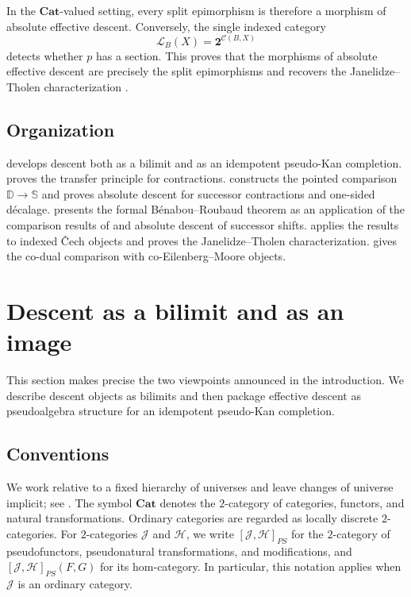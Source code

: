\documentclass[11pt,a4paper]{article}
\numberwithin{equation}{section}
\theoremstyle{definition}
\theoremstyle{remark}
\newcommand{\Hcat}{\mathcal H}
\newcommand{\C}{\mathcal C}
\newcommand{\Lx}{\mathcal L}
\newcommand{\Cat}{\mathbf{Cat}}
\newcommand{\two}{\mathbf 2}
\newcommand{\Dmon}{\mathbb D}
\newcommand{\Smon}{\mathbb S}
\begin{document}
In the \(\Cat\)-valued setting, every split epimorphism is therefore a
morphism of absolute effective descent. Conversely, the single indexed category
\[
\Lx_B(X)=\two^{\C(B,X)}
\]
detects whether \(p\) has a section. This proves that the morphisms of
absolute effective descent are precisely the split epimorphisms and
recovers the Janelidze--Tholen characterization
\cite[Theorem~3.5]{JanelidzeTholen1997}.

\subsection*{Organization}

 develops descent both as a bilimit and as an
idempotent pseudo-Kan completion.  proves the
transfer principle for contractions.
 constructs the pointed comparison
\(\Dmon\to\Smon\) and proves absolute descent for successor
contractions and one-sided d\'ecalage.  presents the
formal B\'enabou--Roubaud theorem as an application of the comparison
results of \cite{Nunes2018} and absolute descent of successor shifts.  applies the results to
indexed \v{C}ech objects and proves the Janelidze--Tholen
characterization.  gives the co-dual comparison
with co-Eilenberg--Moore objects.

\section{Descent as a bilimit and as an image}
\label{sec:descent}

This section makes precise the two viewpoints announced in the
introduction. We describe descent objects as bilimits and then package effective
descent as pseudoalgebra structure for an idempotent pseudo-Kan
completion.

\subsection{Conventions}

We work relative to a fixed hierarchy of universes and leave changes
of universe implicit; see \cite{Levy2018}. The symbol $\Cat$ denotes
the $2$-category of categories, functors, and natural transformations.
Ordinary categories are regarded as locally discrete $2$-categories.
For $2$-categories $\mathcal J$ and $\Hcat$, we
write $[\mathcal J,\Hcat]_{PS}$ for the $2$-category of
pseudofunctors, pseudonatural transformations, and modifications, and
$[\mathcal J,\Hcat]_{PS}(F,G)$ for its hom-category. In particular, this notation
applies when $\mathcal J$ is an ordinary category.
\end{document}
